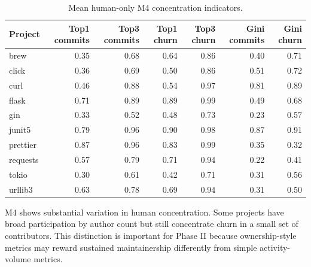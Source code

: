 \begin{table}[H]
\centering
\scriptsize
\renewcommand{\arraystretch}{1.12}
\begin{tabular}{lrrrrrr}
\toprule
\textbf{Project} & \textbf{Top1 commits} & \textbf{Top3 commits} & \textbf{Top1 churn} & \textbf{Top3 churn} & \textbf{Gini commits} & \textbf{Gini churn} \\
\midrule
brew     & 0.35 & 0.68 & 0.64 & 0.86 & 0.40 & 0.71 \\
click    & 0.36 & 0.69 & 0.50 & 0.86 & 0.51 & 0.72 \\
curl     & 0.46 & 0.88 & 0.54 & 0.97 & 0.81 & 0.89 \\
flask    & 0.71 & 0.89 & 0.89 & 0.99 & 0.49 & 0.68 \\
gin      & 0.33 & 0.52 & 0.48 & 0.73 & 0.23 & 0.57 \\
junit5   & 0.79 & 0.96 & 0.90 & 0.98 & 0.87 & 0.91 \\
prettier & 0.87 & 0.96 & 0.83 & 0.99 & 0.35 & 0.32 \\
requests & 0.57 & 0.79 & 0.71 & 0.94 & 0.22 & 0.41 \\
tokio    & 0.30 & 0.61 & 0.42 & 0.71 & 0.31 & 0.56 \\
urllib3  & 0.63 & 0.78 & 0.69 & 0.94 & 0.31 & 0.50 \\
\bottomrule
\end{tabular}
\caption{Mean human-only M4 concentration indicators.}
\label{tab:m4_concentration_profile}
\end{table}

M4 shows substantial variation in human concentration. Some projects have broad participation by author count
but still concentrate churn in a small set of contributors. This distinction is important for Phase II because
ownership-style metrics may reward sustained maintainership differently from simple activity-volume metrics.
